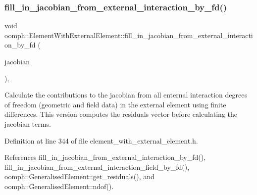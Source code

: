 \subsubsection{\texorpdfstring{fill\+\_\+in\+\_\+jacobian\+\_\+from\+\_\+external\+\_\+interaction\+\_\+by\+\_\+fd()}{fill\_in\_jacobian\_from\_external\_interaction\_by\_fd()}\hspace{0.1cm}{\footnotesize\ttfamily [2/2]}}
{\footnotesize\ttfamily void oomph\+::\+Element\+With\+External\+Element\+::fill\+\_\+in\+\_\+jacobian\+\_\+from\+\_\+external\+\_\+interaction\+\_\+by\+\_\+fd (\begin{DoxyParamCaption}\item[{\hyperlink{classoomph_1_1DenseMatrix}{Dense\+Matrix}$<$ double $>$ \&}]{jacobian }\end{DoxyParamCaption})\hspace{0.3cm}{\ttfamily [inline]}, {\ttfamily [protected]}}



Calculate the contributions to the jacobian from all enternal interaction degrees of freedom (geometric and field data) in the external element using finite differences. This version computes the residuals vector before calculating the jacobian terms. 



Definition at line 344 of file element\+\_\+with\+\_\+external\+\_\+element.\+h.



References fill\+\_\+in\+\_\+jacobian\+\_\+from\+\_\+external\+\_\+interaction\+\_\+by\+\_\+fd(), fill\+\_\+in\+\_\+jacobian\+\_\+from\+\_\+external\+\_\+interaction\+\_\+field\+\_\+by\+\_\+fd(), oomph\+::\+Generalised\+Element\+::get\+\_\+residuals(), and oomph\+::\+Generalised\+Element\+::ndof().

\mbox{\label{classoomph_1_1ElementWithExternalElement_a62e562dd53ec309e124c2e1962cee9e7}} 

